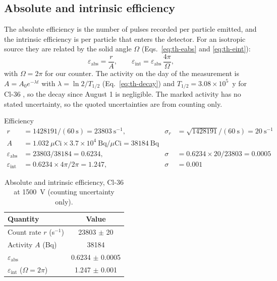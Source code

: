 \documentclass[12pt]{article}
\begin{document}
\subsection{Absolute and intrinsic efficiency}

The absolute efficiency is the number of pulses recorded per particle emitted, and the intrinsic efficiency is per particle that enters the detector. For an isotropic source they are related by the solid angle $\Omega$ (Eqs.~\ref{eq:th-eabs} and \ref{eq:th-eint}):
\begin{equation}
\varepsilon_{\text{abs}} = \frac{r}{A}, \qquad \varepsilon_{\text{int}} = \varepsilon_{\text{abs}}\,\frac{4\pi}{\Omega},
\end{equation}
with $\Omega = 2\pi$ for our counter. The activity on the day of the measurement is $A = A_0 e^{-\lambda t}$ with $\lambda = \ln 2/T_{1/2}$ (Eq.~\ref{eq:th-decay}) and $T_{1/2} = 3.08\times10^5$~y for Cl-36 \cite{knoll}, so the decay since August 1 is negligible. The marked activity has no stated uncertainty, so the quoted uncertainties are from counting only.

\begin{samplecalc}{Efficiency}
\begin{align*}
r &= 1428191/(60\ \text{s}) = 23803\ \text{s}^{-1}, & \sigma_r &= \sqrt{1428191}/(60\ \text{s}) = 20\ \text{s}^{-1}\\
A &= 1.032\ \mu\text{Ci} \times 3.7\times10^{4}\ \text{Bq}/\mu\text{Ci} = 38184\ \text{Bq} & &\\
\varepsilon_{\text{abs}} &= 23803/38184 = 0.6234, & \sigma &= 0.6234 \times 20/23803 = 0.0005\\
\varepsilon_{\text{int}} &= 0.6234 \times 4\pi/2\pi = 1.247, & \sigma &= 0.001
\end{align*}
\end{samplecalc}

\begin{table}[!htbp]
\centering\small
\begin{tabular}{lc}
\toprule
\textbf{Quantity} & \textbf{Value} \\
\midrule
Count rate $r$ (s$^{-1}$) & 23803 $\pm$ 20 \\
Activity $A$ (Bq) & 38184 \\
$\varepsilon_{\text{abs}}$ & 0.6234 $\pm$ 0.0005 \\
$\varepsilon_{\text{int}}$ ($\Omega = 2\pi$) & 1.247 $\pm$ 0.001 \\
\bottomrule
\end{tabular}
\caption{Absolute and intrinsic efficiency, Cl-36 at 1500~V (counting uncertainty only).}
\label{tab:eff}
\end{table}
\end{document}

